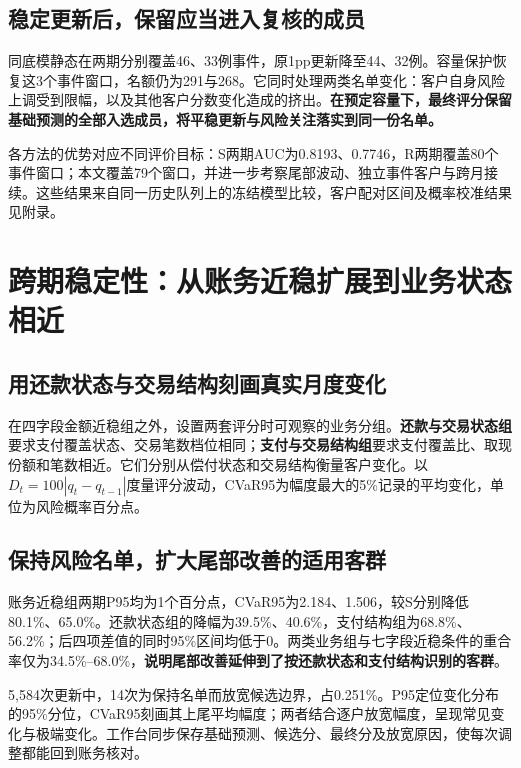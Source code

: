 \subsection{稳定更新后，保留应当进入复核的成员}
同底模静态在两期分别覆盖46、33例事件，原1pp更新降至44、32例。容量保护恢复这3个事件窗口，名额仍为291与268。它同时处理两类名单变化：客户自身风险上调受到限幅，以及其他客户分数变化造成的挤出。\textbf{在预定容量下，最终评分保留基础预测的全部入选成员，将平稳更新与风险关注落实到同一份名单。}

各方法的优势对应不同评价目标：S两期AUC为0.8193、0.7746，R两期覆盖80个事件窗口；本文覆盖79个窗口，并进一步考察尾部波动、独立事件客户与跨月接续。这些结果来自同一历史队列上的冻结模型比较，客户配对区间及概率校准结果见附录。

\clearpage
\section{跨期稳定性：从账务近稳扩展到业务状态相近}
\subsection{用还款状态与交易结构刻画真实月度变化}
在四字段金额近稳组之外，设置两套评分时可观察的业务分组。\textbf{还款与交易状态组}要求支付覆盖状态、交易笔数档位相同；\textbf{支付与交易结构组}要求支付覆盖比、取现份额和笔数相近。它们分别从偿付状态和交易结构衡量客户变化。以$D_t=100|q_t-q_{t-1}|$度量评分波动，CVaR95为幅度最大的5\%记录的平均变化，单位为风险概率百分点。




\subsection{保持风险名单，扩大尾部改善的适用客群}
账务近稳组两期P95均为1个百分点，CVaR95为2.184、1.506，较S分别降低80.1\%、65.0\%。还款状态组的降幅为39.5\%、40.6\%，支付结构组为68.8\%、56.2\%；后四项差值的同时95\%区间均低于0。两类业务组与七字段近稳条件的重合率仅为34.5\%--68.0\%，\textbf{说明尾部改善延伸到了按还款状态和支付结构识别的客群}。

5,584次更新中，14次为保持名单而放宽候选边界，占0.251\%。P95定位变化分布的95\%分位，CVaR95刻画其上尾平均幅度；两者结合逐户放宽幅度，呈现常见变化与极端变化。工作台同步保存基础预测、候选分、最终分及放宽原因，使每次调整都能回到账务核对。

